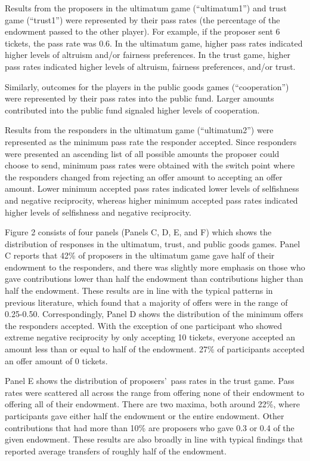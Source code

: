 \documentclass[12pt]{article}
\begin{document}
Results from the proposers in the ultimatum game (``ultimatum1'') and trust game (``trust1'') were represented by their pass rates (the percentage of the endowment passed to the other player). For example, if the proposer sent 6 tickets, the pass rate was 0.6. In the ultimatum game, higher pass rates indicated higher levels of altruism and/or fairness preferences. In the trust game, higher pass rates indicated higher levels of altruism, fairness preferences, and/or trust. 

Similarly, outcomes for the players in the public goods games (``cooperation'') were represented by their pass rates into the public fund. Larger amounts contributed into the public fund signaled higher levels of cooperation.

Results from the responders in the ultimatum game (``ultimatum2'') were represented as the minimum pass rate the responder accepted. Since responders were presented an ascending list of all possible amounts the proposer could choose to send, minimum pass rates were obtained with the switch point where the responders changed from rejecting an offer amount to accepting an offer amount. Lower minimum accepted pass rates indicated lower levels of selfishness and negative reciprocity, whereas higher minimum accepted pass rates indicated higher levels of selfishness and negative reciprocity.

Figure 2 consists of four panels (Panels C, D, E, and F) which shows the distribution of responses in the ultimatum, trust, and public goods games. Panel C reports that 42\% of proposers in the ultimatum game gave half of their endowment to the responders, and there was slightly more emphasis on those who gave contributions lower than half the endowment than contributions higher than half the endowment. These results are in line with the typical patterns in previous literature, which found that a majority of offers were in the range of 0.25-0.50. Correspondingly, Panel D shows the distribution of the minimum offers the responders accepted. With the exception of one participant who showed extreme negative reciprocity by only accepting 10 tickets, everyone accepted an amount less than or equal to half of the endowment. 27\% of participants accepted an offer amount of 0 tickets. 

Panel E shows the distribution of proposers\rq \ pass rates in the trust game. Pass rates were scattered all across the range from offering none of their endowment to offering all of their endowment. There are two maxima, both around 22\%, where participants gave either half the endowment or the entire endowment. Other contributions that had more than 10\% are proposers who gave 0.3 or 0.4 of the given endowment. These results are also broadly in line with typical findings that reported average transfers of roughly half of the endowment.
\end{document}
